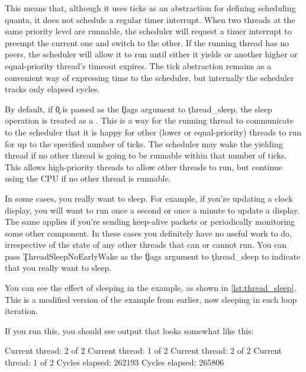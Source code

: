This means that, although it uses ticks as an abstraction for defining scheduling quanta, it does not schedule a regular timer interrupt.
When two threads at the same priority level are runnable, the scheduler will request a timer interrupt to preempt the current one and switch to the other.
If the running thread has no peers, the scheduler will allow it to run until either it yields or another higher or equal-priority thread's timeout expires.
The tick abstraction remains as a convenient way of expressing time to the scheduler, but internally the scheduler tracks only elapsed cycles.

By default, if \c{0} is passed as the \c{flags} argument to \c{thread_sleep}, the sleep operation is treated as a .
This is a way for the running thread to communicate to the scheduler that it is happy for other (lower or equal-priority) threads to run for up to the specified number of ticks.
The scheduler may wake the yielding thread if no other thread is going to be runnable within that number of ticks.
This allows high-priority threads to allow other threads to run, but continue using the CPU if no other thread is runnable.

In some cases, you really want to sleep.
For example, if you're updating a clock display, you will want to run once a second or once a minute to update a display.
The same applies if you're sending keep-alive packets or periodically monitoring some other component.
In these cases you definitely have no useful work to do, irrespective of the state of any other threads that can or cannot run.
You can pass \c{ThreadSleepNoEarlyWake} as the \c{flags} argument to \c{thread_sleep} to indicate that you really want to sleep.

You can see the effect of sleeping in the  example, as shown in \ref{lst:thread_sleep}.
This is a modified version of the  example from earlier, now sleeping in each loop iteration.

\codelisting[filename=examples/thread_sleep/current.cc,marker=entry,label=lst:thread_sleep,caption="A simple example of thread sleeping"]{}

If you run this, you should see output that looks somewhat like this:

\begin{console}
Current thread: 2 of 2
Current thread: 1 of 2
Current thread: 2 of 2
Current thread: 1 of 2
Cycles elapsed: 262193
Cycles elapsed: 265806
\end{console}

